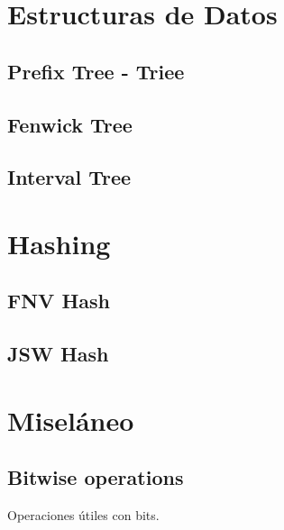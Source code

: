 \documentclass[10pt,letterpaper,twocolumn,twosided]{article}
\newcommand{\codigofuente}[1]{

\dotfill
}
\begin{document}
\section{Estructuras de Datos}

\subsection{Prefix Tree - Triee}

\subsection{Fenwick Tree}

\subsection{Interval Tree}

\section{Hashing} %

\subsection{FNV Hash}

\subsection{JSW Hash}

\section{Miseláneo}

\subsection {Bitwise operations}
Operaciones útiles con bits.

\codigofuente{../src/bitwise.${EXT}}
\end{document}
